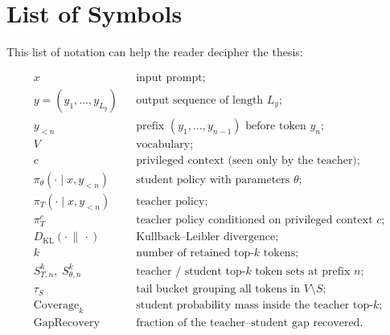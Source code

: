 \chapter{List of Symbols}
        This list of notation can help the reader decipher the thesis:

        \begin{align*}
                x                                       && \text{input prompt;} \\
                y = (y_1, \ldots, y_{L_y})              && \text{output sequence of length $L_y$;} \\
                y_{<n}                                  && \text{prefix $(y_1, \ldots, y_{n-1})$ before token $y_n$;} \\
                V                                       && \text{vocabulary;} \\
                c                                       && \text{privileged context (seen only by the teacher);} \\
                \pi_\theta(\cdot \mid x, y_{<n})        && \text{student policy with parameters $\theta$;} \\
                \pi_T(\cdot \mid x, y_{<n})             && \text{teacher policy;} \\
                \pi_T^{c}                               && \text{teacher policy conditioned on privileged context $c$;} \\
                D_{\mathrm{KL}}(\cdot \,\|\, \cdot)     && \text{Kullback--Leibler divergence;} \\
                k                                       && \text{number of retained top-$k$ tokens;} \\
                S_{T,n}^{k},\; S_{\theta,n}^{k}         && \text{teacher / student top-$k$ token sets at prefix $n$;} \\
                \tau_S                                  && \text{tail bucket grouping all tokens in $V \setminus S$;} \\
                \mathrm{Coverage}_{k}                   && \text{student probability mass inside the teacher top-$k$;} \\
                \mathrm{GapRecovery}                    && \text{fraction of the teacher--student gap recovered.}
        \end{align*}


